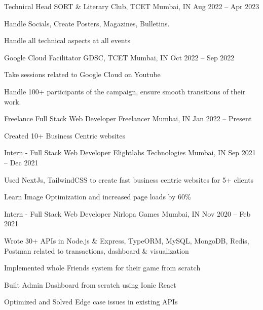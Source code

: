 \documentclass[]{awesome-cv}
\begin{document}
\vspace{-2mm}
\begin{cventries}
	\cventry
	{Technical Head}
	{SORT \& Literary Club, TCET}
	{Mumbai, IN}
	{Aug 2022 – Apr 2023}
	{\begin{cvitems}
		\item {Handle Socials, Create Posters, Magazines, Bulletins.}
		\item {Handle all technical aspects at all events}
		\end{cvitems}}
	\cventry
	{Google Cloud Facilitator}
	{GDSC, TCET}
	{Mumbai, IN}
	{Oct 2022 – Sep 2022}
	{\begin{cvitems}
		\item {Take sessions related to Google Cloud on Youtube}
		\item {Handle 100+ participants of the campaign, ensure smooth transitions of their work.}
		\end{cvitems}}
	\cventry
	{Freelance Full Stack Web Developer}
	{Freelancer}
	{Mumbai, IN}
	{Jan 2022 – Present}
	{\begin{cvitems}
		\item {Created 10+ Business Centric websites}
		\end{cvitems}}
	\cventry
	{Intern - Full Stack Web Developer}
	{Elightlabs Technologies}
	{Mumbai, IN}
	{Sep 2021 – Dec 2021}
	{\begin{cvitems}
		\item {Used NextJs, TailwindCSS to create fast business centric websites for 5+ clients}
		\item {Learn Image Optimization and increased page loads by 60\%}
		\end{cvitems}}
	\cventry
	{Intern - Full Stack Web Developer}
	{Nirlopa Games}
	{Mumbai, IN}
	{Nov 2020 – Feb 2021}
	{\begin{cvitems}
		\item {Wrote 30+ APIs in Node.js \& Express, TypeORM, MySQL, MongoDB, Redis, Postman related to transactions, dashboard \& visualization}
		\item {Implemented whole Friends system for their game from scratch}
		\item {Built Admin Dashboard from scratch using Ionic React}
		\item {Optimized and Solved Edge case issues in existing APIs}
		\end{cvitems}}		
\end{cventries}
\end{document}
